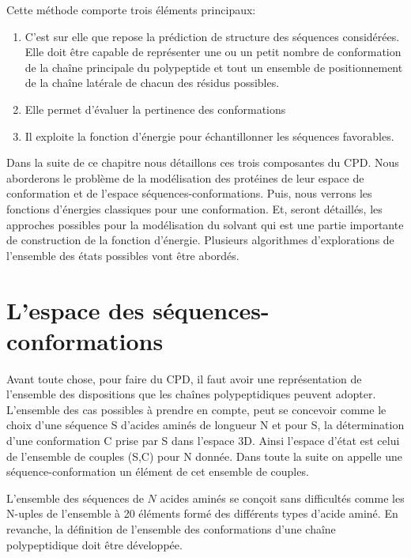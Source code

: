 Cette méthode comporte trois éléments principaux:
\begin{enumerate}
\item {}
  
  C'est sur elle que repose la prédiction de structure des séquences considérées. Elle doit être capable de représenter une ou un petit nombre de conformation de la chaîne principale du polypeptide et tout un ensemble de positionnement de la chaîne latérale de chacun des résidus possibles.
\item {}

  Elle permet d'évaluer la pertinence des conformations 
\item {}

  Il exploite la fonction d'énergie pour échantillonner les séquences favorables.
  
\end{enumerate}

Dans la suite de ce chapitre nous détaillons ces trois composantes du CPD. Nous aborderons le problème de la modélisation des protéines de leur espace de conformation et de l'espace séquences-conformations. Puis, nous verrons les fonctions d'énergies classiques pour une conformation. Et, seront détaillés, les approches possibles pour la modélisation du solvant qui est une partie importante de construction de la fonction d'énergie. Plusieurs algorithmes d'explorations de l'ensemble des états possibles vont être abordés.  


\section{L'espace des séquences-conformations}
Avant toute chose, pour faire du CPD, il faut avoir une représentation de l'ensemble des dispositions que les chaînes polypeptidiques peuvent adopter. L'ensemble des cas possibles à prendre en compte, peut se concevoir comme le choix d'une séquence S d'acides aminés de longueur N  et pour S, la détermination d'une conformation C prise par S dans l'espace 3D. Ainsi l'espace d'état est celui de l'ensemble de couples (S,C) pour N donnée. Dans toute la suite on appelle une séquence-conformation un élément de cet ensemble de couples.   

L'ensemble des séquences de $N$ acides aminés se conçoit sans difficultés comme les N-uples de l'ensemble à 20 éléments formé des différents types d'acide aminé. En revanche, la définition de l'ensemble des conformations d'une chaîne polypeptidique doit être développée.

